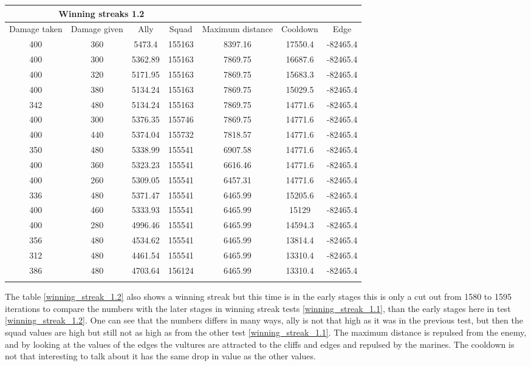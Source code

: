 






\begin{centering}
 \begin{tabular}{|c||c|c|c|c|c|c|}
	\multicolumn{4}{c}{Winning streaks 1.2} \\
	\hline
	Damage taken & Damage given & Ally & Squad & Maximum distance & Cooldown & Edge \\
	\hline
	400&		360&			5473.4&	 155163&	8397.16&		17550.4&	-82465.4\\
	400&		300&			5362.89& 155163&	7869.75&		16687.6&	-82465.4\\
	400&		320&			5171.95& 155163&	7869.75&		15683.3&	-82465.4\\
	400&		380&			5134.24& 155163&	7869.75&		15029.5&	-82465.4\\
	342&		480&			5134.24& 155163&	7869.75&		14771.6&	-82465.4\\
	400&		300&			5376.35& 155746&	7869.75&		14771.6&	-82465.4\\
	400&		440&			5374.04& 155732&	7818.57&		14771.6&	-82465.4\\
	350&		480&			5338.99& 155541&	6907.58&		14771.6&	-82465.4\\
	400&		360&			5323.23& 155541&	6616.46&		14771.6&	-82465.4\\
	400&		260&			5309.05& 155541&	6457.31&		14771.6&	-82465.4\\
	336&		480&			5371.47& 155541&	6465.99&		15205.6&	-82465.4\\
	400&		460&			5333.93& 155541&	6465.99&		15129& 		-82465.4\\
	400&		280&			4996.46& 155541&	6465.99&		14594.3&	-82465.4\\
	356&		480&			4534.62& 155541&	6465.99&		13814.4&	-82465.4\\
	312&		480&			4461.54& 155541&	6465.99&		13310.4&	-82465.4\\
	386&		480&			4703.64& 156124&	6465.99&		13310.4&	-82465.4\\
	\hline
	\label{winning_streak_1.2}
\end{tabular}
\end{centering}
The table \ref{winning_streak_1.2} also shows a winning streak but this time is in the early stages this is only a cut out from 1580 to 1595 iterations to compare the numbers with the later stages in winning streak tests \ref{winning_streak_1.1}, than the early stages here in test \ref{winning_streak_1.2}. One can see that the numbers differs in many ways, ally is not that high as it was in the previous test, but then the squad values are high but still not as high as from the other test \ref{winning_streak_1.1}. The maximum distance is repulsed from the enemy, and by looking at the values of the edges the vultures are attracted to the cliffs and edges and repulsed by the marines. The cooldown is not that interesting to talk about it has the same drop in value as the other values.

